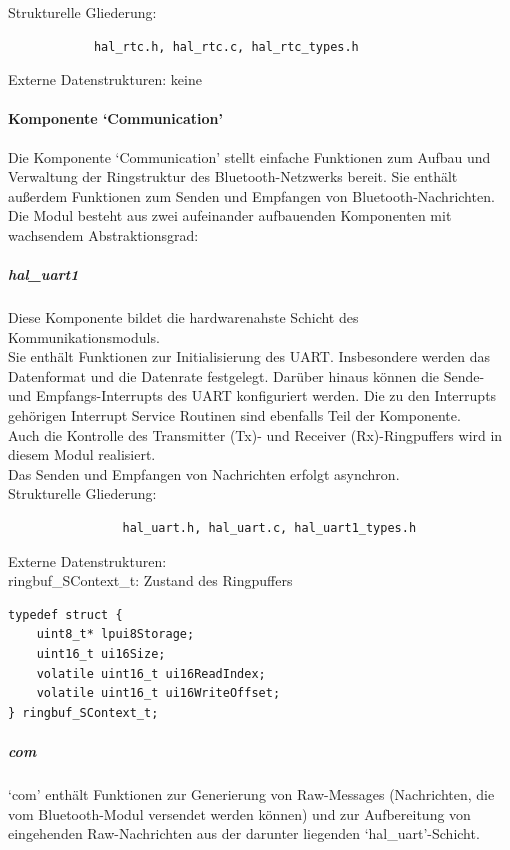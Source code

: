 \documentclass[10pt,a4paper]{article}
\begin{document}
			Strukturelle Gliederung:
			\begin{verbatim}  
			hal_rtc.h, hal_rtc.c, hal_rtc_types.h
			\end{verbatim}
			
			Externe Datenstrukturen: keine
			
			\paragraph*{Komponente `Communication'}
			Die Komponente `Communication' stellt einfache Funktionen zum Aufbau und Verwaltung der Ringstruktur des Bluetooth-Netzwerks bereit.
			Sie enthält außerdem Funktionen zum Senden und Empfangen von Bluetooth-Nachrichten.\\
			 
			Die Modul besteht aus zwei aufeinander aufbauenden Komponenten mit wachsendem Abstraktionsgrad:
			
				\subparagraph*{hal\_uart1}
				Diese Komponente bildet die hardwarenahste Schicht des Kommunikationsmoduls. \\
				Sie enthält Funktionen zur Initialisierung des UART. Insbesondere werden das Datenformat und die Datenrate festgelegt.
				Darüber hinaus können die Sende- und Empfangs-Interrupts des UART konfiguriert werden. Die zu den Interrupts gehörigen Interrupt
				Service Routinen sind ebenfalls Teil der Komponente. \\
				Auch die Kontrolle des Transmitter (Tx)- und Receiver (Rx)-Ringpuffers wird in diesem Modul realisiert. \\
				Das Senden und Empfangen von Nachrichten erfolgt asynchron. \\
				
				Strukturelle Gliederung:
				\begin{verbatim}  
				hal_uart.h, hal_uart.c, hal_uart1_types.h
				\end{verbatim}
				
				Externe Datenstrukturen: \\
				ringbuf\_SContext\_t: Zustand des Ringpuffers
				
				\lstset{language = C, tabsize = 4}
				\begin{lstlisting}[frame = single]
typedef struct {
	uint8_t* lpui8Storage;
	uint16_t ui16Size;
	volatile uint16_t ui16ReadIndex;
	volatile uint16_t ui16WriteOffset;
} ringbuf_SContext_t;
				\end{lstlisting}
				
				\subparagraph*{com}
				`com' enthält Funktionen zur Generierung von Raw-Messages (Nachrichten, die vom Bluetooth-Modul versendet werden
				können) und zur Aufbereitung von eingehenden Raw-Nachrichten aus der darunter liegenden `hal\_uart'-Schicht. \\
				
\end{document}
